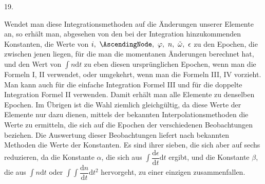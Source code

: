 \par{}\bigskip
{}
\begin{center}19.\end{center}
\begingroup
\setlength{\lineskip}{4pt}\setlength{\lineskiplimit}{4pt}
\noindent\hspace*{\parindent}Wendet man diese Integrationsmethoden auf die Änderungen unserer Elemente an, so erhält man, abgesehen von den bei der Integration hinzukommenden Konstanten, die Werte von \(i,\ \AscendingNode,\ \varphi,\ n,\ \tilde\omega,\ \epsilon\) zu den Epochen, die zwischen jenen liegen, für die man die momentanen Änderungen berechnet hat, und den Wert von \(\int n\mathrm{d}t\) zu eben diesen ursprünglichen Epochen, wenn man die Formeln I, II verwendet, oder umgekehrt, wenn man die Formeln III, IV vorzieht. Man kann auch für die einfache Integration Formel III und für die doppelte Integration Formel II verwenden. Damit erhält man alle Elemente zu denselben Epochen. Im Übrigen ist die Wahl ziemlich gleichgültig, da diese Werte der Elemente nur dazu dienen, mittels der bekannten Interpolationsmethoden die Werte zu ermitteln, die sich auf die Epochen der verschiedenen Beobachtungen beziehen. Die Auswertung dieser Beobachtungen liefert nach bekannten Methoden die Werte der Konstanten. Es sind ihrer sieben, die sich aber auf sechs reduzieren, da die Konstante \(\alpha\), die sich aus \(\int\dfrac{\mathrm{d}\epsilon}{\mathrm{d}t}\mathrm{d}t\) ergibt, und die Konstante \(\beta\), die aus \(\int n\mathrm{d}t\) oder \(\int\!\int\dfrac{\mathrm{d}n}{\mathrm{d}t}\mathrm{d}t^2\) hervorgeht, zu einer einzigen zusammenfallen.
\par\endgroup
